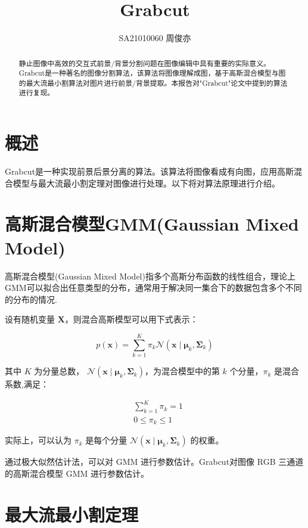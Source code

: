 \documentclass[12pt]{article}
\title{\LARGE\textbf{Grabcut}}
\author{SA21010060 周俊亦}
\date{}
\begin{document}
	\maketitle
	\renewcommand{\abstractname}{Abstract}
	\begin{abstract}
		静止图像中高效的交互式前景/背景分割问题在图像编辑中具有重要的实际意义。Grabcut是一种著名的图像分割算法，该算法将图像理解成图，基于高斯混合模型与图的最大流最小割算法对图片进行前景/背景提取。本报告对"Grabcut"论文中提到的算法进行复现。
	\end{abstract}
	
	\section{概述}
	Grabcut是一种实现前景后景分离的算法。该算法将图像看成有向图，应用高斯混合模型与最大流最小割定理对图像进行处理。以下将对算法原理进行介绍。
	
	
	
	\section{高斯混合模型GMM(Gaussian Mixed Model)}
	高斯混合模型(Gaussian Mixed Model)指多个高斯分布函数的线性组合，理论上GMM可以拟合出任意类型的分布，通常用于解决同一集合下的数据包含多个不同的分布的情况.
	
	设有随机变量 $\boldsymbol{X}$，则混合高斯模型可以用下式表示：
	
	$$
	p(\boldsymbol{x})=\sum_{k=1}^{K} \pi_{k} \mathcal{N}\left(\boldsymbol{x} \mid \boldsymbol{\mu}_{k}, \boldsymbol{\Sigma}_{k}\right)
	$$
	
	其中 $K$ 为分量总数， $\mathcal{N}\left(\boldsymbol{x} \mid \boldsymbol{\mu}_{k}, \boldsymbol{\Sigma}_{k}\right)$，为混合模型中的第 $k$ 个分量，$\pi_{k}$ 是混合系数,满足：
	
	$$
	\begin{aligned}
		&\sum_{k=1}^{K} \pi_{k}=1 \\
		&0 \leq \pi_{k} \leq 1
	\end{aligned}
	$$
	
	实际上，可以认为 $\pi_{k}$ 是每个分量 $\mathcal{N}\left(\boldsymbol{x} \mid \boldsymbol{\mu}_{k}, \boldsymbol{\Sigma}_{k}\right)$ 的权重。
	
	通过极大似然估计法，可以对 GMM 进行参数估计。Grabcut对图像 RGB 三通道的高斯混合模型 GMM 进行参数估计。
	
	
	\section{最大流最小割定理}
	
\end{document}

